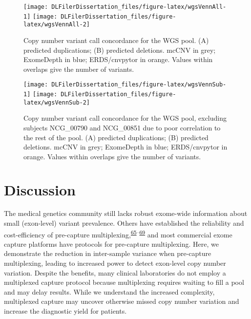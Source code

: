 \documentclass[11pt,letterpaper]{book}
\begin{document}
\begin{figure}

{\centering \texttt{[image: DLFilerDissertation\_files/figure-latex/wgsVennAll-1]} \texttt{[image: DLFilerDissertation\_files/figure-latex/wgsVennAll-2]} 

}

\caption[Copy number variant call concordance for the WGS pool.]{Copy number variant call concordance for the WGS pool. (A) predicted duplications; (B) predicted deletions. mcCNV in grey; ExomeDepth in blue; ERDS/cnvpytor in orange. Values within overlaps give the number of variants.}\label{fig:wgsVennAll}
\end{figure}



\begin{figure}

{\centering \texttt{[image: DLFilerDissertation\_files/figure-latex/wgsVennSub-1]} \texttt{[image: DLFilerDissertation\_files/figure-latex/wgsVennSub-2]} 

}

\caption[Copy number variant call concordance for the WGS pool, excluding subjects NCG\_00790 and NCG\_00851 due to poor correlation to the rest of the pool.]{Copy number variant call concordance for the WGS pool, excluding subjects NCG\_00790 and NCG\_00851 due to poor correlation to the rest of the pool. (A) predicted duplications; (B) predicted deletions. mcCNV in grey; ExomeDepth in blue; ERDS/cnvpytor in orange. Values within overlaps give the number of variants.}\label{fig:wgsVennSub}
\end{figure}

\hypertarget{discussion}{%
\section{Discussion}\label{discussion}}

The medical genetics community still lacks robust exome-wide information about small (exon-level) variant prevalence.
Others have established the reliability and cost-efficiency of pre-capture multiplexing,\textsuperscript{\protect\hyperlink{ref-neiman:2012aa}{65}--\protect\hyperlink{ref-shearer:2012aa}{69}} and most commercial exome capture platforms have protocols for pre-capture multiplexing.
Here, we demonstrate the reduction in inter-sample variance when pre-capture multiplexing, leading to increased power to detect exon-level copy number variation.
Despite the benefits, many clinical laboratories do not employ a multiplexed capture protocol because multiplexing requires waiting to fill a pool and may delay results.
While we understand the increased complexity, multiplexed capture may uncover otherwise missed copy number variation and increase the diagnostic yield for patients.
\end{document}
